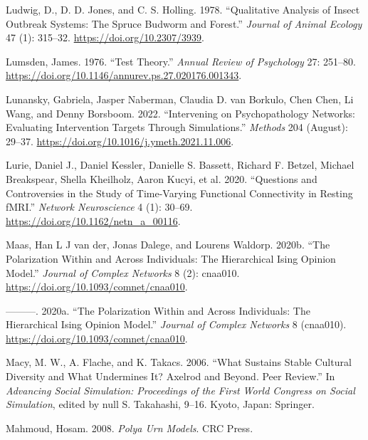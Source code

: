 \documentclass[
  letterpaper,
]{scrbook}
\newlength{\cslhangindent}
\newlength{\cslentryspacingunit} %
\newenvironment{CSLReferences}[2] %
 {%
  \setlength{\parindent}{0pt}
  \ifodd #1
  \let\oldpar\par
  \def\par{\hangindent=\cslhangindent\oldpar}
  \fi
  \setlength{\parskip}{#2\cslentryspacingunit}
 }%
 {}
\begin{document}
\begin{CSLReferences}{1}{0}
\leavevmode{}%
Ludwig, D., D. D. Jones, and C. S. Holling. 1978. {``Qualitative
Analysis of Insect Outbreak Systems: The Spruce Budworm and Forest.''}
\emph{Journal of Animal Ecology} 47 (1): 315--32.
\url{https://doi.org/10.2307/3939}.

\leavevmode{}%
Lumsden, James. 1976. {``Test Theory.''} \emph{Annual Review of
Psychology} 27: 251--80.
\url{https://doi.org/10.1146/annurev.ps.27.020176.001343}.

\leavevmode{}%
Lunansky, Gabriela, Jasper Naberman, Claudia D. van Borkulo, Chen Chen,
Li Wang, and Denny Borsboom. 2022. {``Intervening on Psychopathology
Networks: {Evaluating} Intervention Targets Through Simulations.''}
\emph{Methods} 204 (August): 29--37.
\url{https://doi.org/10.1016/j.ymeth.2021.11.006}.

\leavevmode{}%
Lurie, Daniel J., Daniel Kessler, Danielle S. Bassett, Richard F.
Betzel, Michael Breakspear, Shella Kheilholz, Aaron Kucyi, et al. 2020.
{``Questions and Controversies in the Study of Time-Varying Functional
Connectivity in Resting {fMRI}.''} \emph{Network Neuroscience} 4 (1):
30--69. \url{https://doi.org/10.1162/netn_a_00116}.

\leavevmode{}%
Maas, Han L J van der, Jonas Dalege, and Lourens Waldorp. 2020b. {``The
Polarization Within and Across Individuals: The Hierarchical Ising
Opinion Model.''} \emph{Journal of Complex Networks} 8 (2): cnaa010.
\url{https://doi.org/10.1093/comnet/cnaa010}.

\leavevmode{}%
---------. 2020a. {``The Polarization Within and Across Individuals: The
Hierarchical Ising Opinion Model.''} \emph{Journal of Complex Networks}
8 (cnaa010). \url{https://doi.org/10.1093/comnet/cnaa010}.

\leavevmode{}%
Macy, M. W., A. Flache, and K. Takacs. 2006. {``What {Sustains Stable
Cultural Diversity} and {What Undermines It}? {Axelrod} and Beyond.
{Peer} Review.''} In \emph{Advancing {Social Simulation}: {Proceedings}
of the {First World Congress} on {Social Simulation}}, edited by null S.
Takahashi, 9--16. {Kyoto, Japan}: {Springer}.

\leavevmode{}%
Mahmoud, Hosam. 2008. \emph{Polya {Urn Models}}. {CRC Press}.


\end{CSLReferences}
\end{document}
